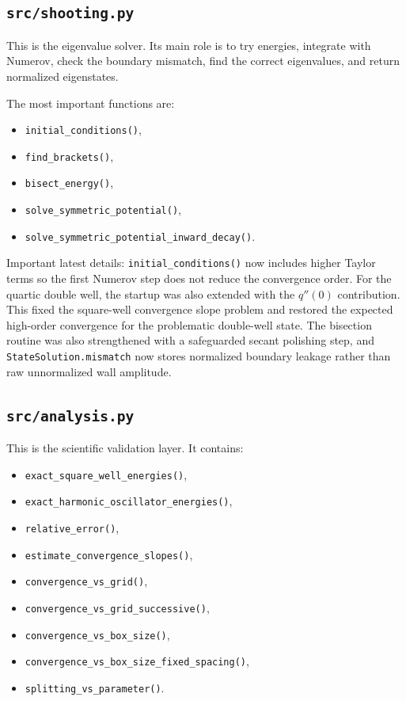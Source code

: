 \documentclass[11pt]{article}
\begin{document}
    \subsection{\texttt{src/shooting.py}}

    This is the eigenvalue solver. Its main role is to try energies, integrate with Numerov, check the boundary mismatch, find the correct eigenvalues, and return normalized eigenstates.

    The most important functions are:
    \begin{itemize}
        \item \texttt{initial\_conditions()},
        \item \texttt{find\_brackets()},
        \item \texttt{bisect\_energy()},
        \item \texttt{solve\_symmetric\_potential()},
        \item \texttt{solve\_symmetric\_potential\_inward\_decay()}.
    \end{itemize}

    Important latest details: \texttt{initial\_conditions()} now includes higher Taylor terms so the first Numerov step does not reduce the convergence order. For the quartic double well, the startup was also extended with the $q''(0)$ contribution. This fixed the square-well convergence slope problem and restored the expected high-order convergence for the problematic double-well state. The bisection routine was also strengthened with a safeguarded secant polishing step, and \texttt{StateSolution.mismatch} now stores normalized boundary leakage rather than raw unnormalized wall amplitude.

    \subsection{\texttt{src/analysis.py}}

    This is the scientific validation layer. It contains:
    \begin{itemize}
        \item \texttt{exact\_square\_well\_energies()},
        \item \texttt{exact\_harmonic\_oscillator\_energies()},
        \item \texttt{relative\_error()},
        \item \texttt{estimate\_convergence\_slopes()},
        \item \texttt{convergence\_vs\_grid()},
        \item \texttt{convergence\_vs\_grid\_successive()},
        \item \texttt{convergence\_vs\_box\_size()},
        \item \texttt{convergence\_vs\_box\_size\_fixed\_spacing()},
        \item \texttt{splitting\_vs\_parameter()}.
    \end{itemize}
\end{document}
